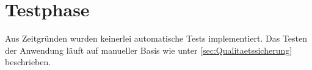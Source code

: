 \section{Testphase} 
\label{sec:Testphase}
Aus Zeitgründen wurden keinerlei automatische Tests implementiert. Das Testen
der Anwendung läuft auf manueller Basis wie unter
\ref{sec:Qualitaetssicherung} beschrieben.
